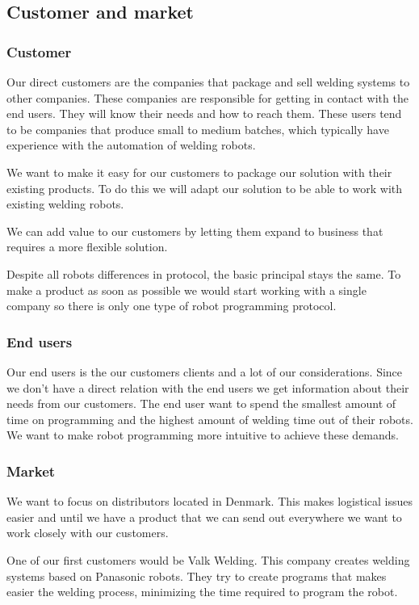 \subsection{Customer and market}

\subsubsection{Customer}
Our direct customers are the companies that package and sell welding systems to other companies. 
These companies are responsible for getting in contact with the end users. 
They will know their needs and how to reach them. 
These users tend to be companies that produce small to medium batches, which typically have experience with the automation of welding robots.

We want to make it easy for our customers to package our solution with their existing products.
To do this we will adapt our solution to be able to work with existing welding robots.

We can add value to our customers by letting them expand to business that requires a more flexible solution.

Despite all robots differences in protocol, the basic principal stays the same.
To make a product as soon as possible we would start working with a single company so there is only one type of robot programming protocol.

\subsubsection{End users}
Our end users is the our customers clients and a lot of our considerations.
Since we don't have a direct relation with the end users we get information about their needs from our customers.
The end user want to spend the smallest amount of time on programming and the highest amount of welding time out of their robots.
We want to make robot programming more intuitive to achieve these demands.

\subsubsection{Market}
We want to focus on distributors located in Denmark.
This makes logistical issues easier and until we have a product that we can send out everywhere we want to work closely with our customers.

One of our first customers would be Valk Welding. This company creates welding systems based on Panasonic robots. They try to create programs that makes easier the welding process, minimizing the time required to program the robot.

